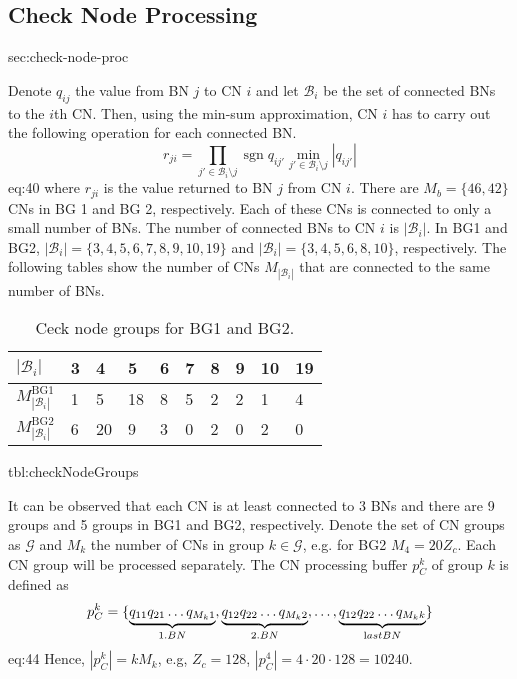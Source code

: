 \documentclass{article}
\def\Bcal{\mathcal{B}}
\def\Gcal{\mathcal{G}}
\def\Mb{{M_b}}
\def\Zc{{Z_c}}
\newcommand{\sgn}{\operatorname{sgn}}
\begin{document}
\newpage
\subsection{Check Node Processing}{sec:check-node-proc}

Denote $q_{ij}$ the value from BN $j$ to CN $i$ and let $\Bcal_i$ be the set of connected BNs to the $i$th CN. Then, using the min-sum approximation, CN $i$ has to carry out the following operation for each connected BN.
\begin{equation}
  r_{ji} = \prod_{j'\in\Bcal_i\setminus j}\sgn q_{ij'}\min_{j'\in\Bcal_i\setminus j} |q_{ij'}|
\end{equation}{eq:40}
where $r_{ji}$ is the value returned to BN $j$ from CN $i$. There are $\Mb = \{46,42\}$ CNs in BG 1 and BG 2, respectively. Each of these CNs is connected to only a small number of BNs. The number of connected BNs to CN $i$ is $|\Bcal_i|$. In BG1 and BG2, $|\Bcal_i|=\{3,4,5,6,7,8,9,10,19\}$ and $|\Bcal_i|=\{3,4,5,6,8,10\}$, respectively. The following tables show the number of CNs $M_{|\Bcal_i|}$ that are connected to the same number of BNs.

\begin{table}[ht]
  \centering
  \begin{tabular}{llllllllll}
    \toprule
    $|\Bcal_i|$   & 3 & 4 & 5 & 6 & 7 & 8 & 9 & 10 & 19 \\
    \midrule
    $M_{|\Bcal_i|}^\mathrm{BG1}$ & 1 & 5  &18 & 8 & 5 & 2 & 2 & 1 & 4 \\
    $M_{|\Bcal_i|}^\mathrm{BG2}$ & 6 & 20 & 9 & 3 & 0 & 2 & 0 & 2 & 0 \\
    \bottomrule
  \end{tabular}
  \caption{Ceck node groups for BG1 and BG2.}
\end{table}{tbl:checkNodeGroups}

It can be observed that each CN is at least connected to 3 BNs and there are 9 groups and 5 groups in BG1 and BG2, respectively. Denote the set of CN groups as $\Gcal$ and $M_k$ the number of CNs in group $k\in\Gcal$, e.g. for BG2 $M_4=20\Zc$. Each CN group will be processed separately. The CN processing buffer $p_C^k$ of group $k$ is defined as
\begin{equation}
  p_C^k = \{\underbrace{q_{11}q_{21}\dots q_{M_k 1}}_{\text 1. BN},\underbrace{q_{12}q_{22}\dots q_{M_k 2}}_{\text 2. BN},\dots,\underbrace{q_{12}q_{22}\dots q_{M_k k}}_{\text last BN}\}
\end{equation}{eq:44}
Hence, $|p_C^k| = kM_k$, e.g, $\Zc=128$, $|p_C^4| = 4\cdot 20\cdot 128 = 10240$.
\end{document}
